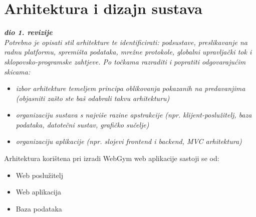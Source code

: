 \chapter{Arhitektura i dizajn sustava}
		
		\textbf{\textit{dio 1. revizije}}\\

		\textit{ Potrebno je opisati stil arhitekture te identificirati: podsustave, preslikavanje na radnu platformu, spremišta podataka, mrežne protokole, globalni upravljački tok i sklopovsko-programske zahtjeve. Po točkama razraditi i popratiti odgovarajućim skicama:}
	\begin{itemize}
		\item 	\textit{izbor arhitekture temeljem principa oblikovanja pokazanih na predavanjima (objasniti zašto ste baš odabrali takvu arhitekturu)}
		\item 	\textit{organizaciju sustava s najviše razine apstrakcije (npr. klijent-poslužitelj, baza podataka, datotečni sustav, grafičko sučelje)}
		\item 	\textit{organizaciju aplikacije (npr. slojevi frontend i backend, MVC arhitektura) }		
	\end{itemize}
	
	Arhitektura korištena pri izradi WebGym web aplikacije sastoji se od:
	\begin{itemize}
		\item   Web poslužitelj
		\item 	Web aplikacija
		\item 	Baza podataka		
	\end{itemize}
	
